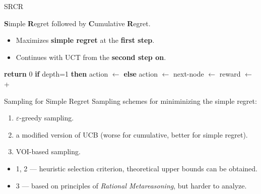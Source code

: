\documentclass{beamer}
\begin{document}
\begin{frame}{SRCR}

{\bf S}imple {\bf R}egret followed by {\bf C}umulative {\bf R}egret.
\begin{itemize}
\item Maximizes {\bf simple regret} at the {\bf first step}.
\item Continues with UCT from the {\bf second step on}.
\end{itemize}
\vspace{1em}
\begin{algorithmic}[1]
    \State \textbf{return} 0
  \Else
    \State \textbf{if} depth=1 \textbf{then} action $\gets$  \label{alg:srcr-first-action}   
    \State \textbf{else} action $\gets$  \label{alg:srcr-next-action}
    \State next-node $\gets$ 
    \State reward $\gets$ 
     \State \hspace{4em} + 
    \State {}
  \EndIf
\EndProcedure
\end{algorithmic}
\end{frame}

\begin{frame}{Sampling for Simple Regret}
Sampling schemes for miniminizing the simple regret:
\begin{enumerate}
\item $\varepsilon$-greedy sampling.
\item a modified version of UCB (worse for cumulative, better for
  simple regret).
\item<+-> VOI-based sampling.
\end{enumerate}

\begin{itemize}
\item<+-> 1, 2 --- heuristic selection criterion, theoretical upper bounds
  can be obtained.
\item<+-> 3 --- based on principles of {\it Rational Metareasoning},
  but harder to analyze.
\end{itemize}

\end{frame}
\end{document}
